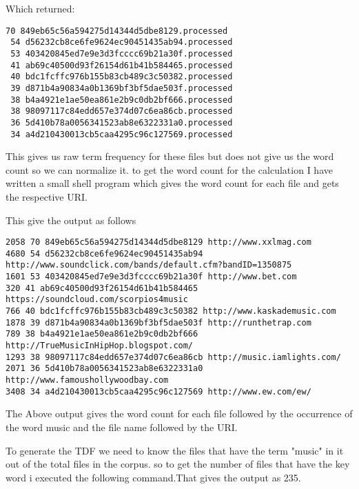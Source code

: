 Which returned:
\begin{lstlisting}[frame=single]
 70 849eb65c56a594275d14344d5dbe8129.processed
 54 d56232cb8ce6fe9624ec90451435ab94.processed
 53 403420845ed7e9e3d3fcccc69b21a30f.processed
 41 ab69c40500d93f26154d61b41b584465.processed
 40 bdc1fcffc976b155b83cb489c3c50382.processed
 39 d871b4a90834a0b1369bf3bf5dae503f.processed
 38 b4a4921e1ae50ea861e2b9c0db2bf666.processed
 38 98097117c84edd657e374d07c6ea86cb.processed
 36 5d410b78a0056341523ab8e6322331a0.processed
 34 a4d210430013cb5caa4295c96c127569.processed
\end{lstlisting}


 This gives us raw term frequency for these files but does not give us the word count so we can normalize it. to get the word count for the calculation I have written a small shell program which gives the word count for each file and gets the respective URI.



 This give the output as follows 
\begin{lstlisting}[frame=single,breaklines=true]
2058 70 849eb65c56a594275d14344d5dbe8129 http://www.xxlmag.com
4680 54 d56232cb8ce6fe9624ec90451435ab94 http://www.soundclick.com/bands/default.cfm?bandID=1350875
1601 53 403420845ed7e9e3d3fcccc69b21a30f http://www.bet.com
320 41 ab69c40500d93f26154d61b41b584465 https://soundcloud.com/scorpios4music
766 40 bdc1fcffc976b155b83cb489c3c50382 http://www.kaskademusic.com
1878 39 d871b4a90834a0b1369bf3bf5dae503f http://runthetrap.com
789 38 b4a4921e1ae50ea861e2b9c0db2bf666 http://TrueMusicInHipHop.blogspot.com/
1293 38 98097117c84edd657e374d07c6ea86cb http://music.iamlights.com/
2071 36 5d410b78a0056341523ab8e6322331a0 http://www.famoushollywoodbay.com
3408 34 a4d210430013cb5caa4295c96c127569 http://www.ew.com/ew/
\end{lstlisting}
 The Above output gives the word count for each file followed by the occurrence of the word music and the file name followed by the URI.
\newpage

To generate the TDF we need to know the files that have the term "music" in it out of the total files in the corpus. so to get the number of files that have the key word i executed the following command.That gives the output as 235.

